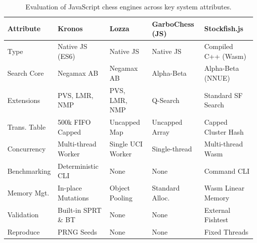 \begin{table}[htbp]
\centering
\caption[Evaluation of JavaScript Chess Engines]{Evaluation of JavaScript chess engines across key system attributes.}
\label{tab:engine_comparison}
\begin{tabularx}{\textwidth}{lXXXX}
\toprule
\textbf{Attribute} & \textbf{Kronos} & \textbf{Lozza} & \textbf{GarboChess (JS)} & \textbf{Stockfish.js} \\
\midrule
Type & Native JS (ES6) & Native JS & Native JS & Compiled C++ (Wasm) \\
Search Core & Negamax AB & Negamax AB & Alpha-Beta & Alpha-Beta (NNUE) \\
Extensions & PVS, LMR, NMP & PVS, LMR, NMP & Q-Search & Standard SF Search \\
Trans. Table & 500k FIFO Capped & Uncapped Map & Uncapped Array & Capped Cluster Hash \\
Concurrency & Multi-thread Worker & Single UCI Worker & Single-thread & Multi-thread Wasm \\
Benchmarking & Deterministic CLI & None & None & Command CLI \\
Memory Mgt. & In-place Mutations & Object Pooling & Standard Alloc. & Wasm Linear Memory \\
Validation & Built-in SPRT \& BT & None & None & External Fishtest \\
Reproduce & PRNG Seeds & None & None & Fixed Threads \\
\bottomrule
\end{tabularx}
\end{table}

